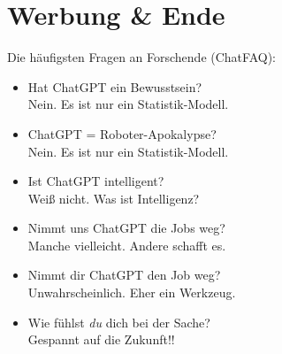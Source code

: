 \documentclass[aspectratio=169,usenames,dvipsnames]{beamer}
\begin{document}
\section{Werbung \& Ende}

\begin{frame}
\begin{center}
Die häufigsten Fragen an Forschende (ChatFAQ):\pause
\end{center}
\bigskip

\begin{minipage}{0.5\textwidth}
\begin{itemize}
\item Hat ChatGPT ein Bewusstsein?\\ Nein. Es ist nur ein Statistik-Modell.\pause\medskip

\item ChatGPT = Roboter-Apokalypse?\\ Nein. Es ist nur ein Statistik-Modell.\pause\medskip

\item Ist ChatGPT intelligent?\\ Weiß nicht. Was ist \glqq Intelligenz\grqq ?\pause
\end{itemize}
\end{minipage}%
\begin{minipage}{0.5\textwidth}
\begin{itemize}
\item Nimmt uns ChatGPT die Jobs weg?\\ Manche vielleicht. Andere schafft es.\pause\medskip

\item Nimmt dir ChatGPT den Job weg?\\ Unwahrscheinlich. Eher ein Werkzeug.\pause\medskip

\item Wie fühlst \emph{du} dich bei der Sache?\\ Gespannt auf die Zukunft!!
\end{itemize}
\end{minipage}
\end{frame}
\end{document}
